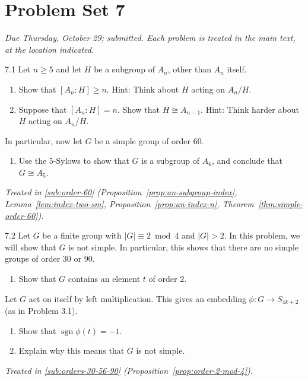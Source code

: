 \documentclass[11pt]{report}
\newcommand{\sgn}{\operatorname{sgn}}
\begin{document}
\section*{Problem Set 7}
{}

\textit{Due Thursday, October 29; submitted. Each problem is treated in the main text, at the location indicated.}

\begin{hwbox}{7.1}\label{hw:7.1}
Let $n \geq 5$ and let $H$ be a subgroup of $A_n$, other than $A_n$ itself.
\begin{enumerate}
\item Show that $[A_n : H] \geq n$. Hint: Think about $H$ acting on $A_n/H$.
\item Suppose that $[A_n : H] = n$. Show that $H \cong A_{n-1}$. Hint: Think harder about $H$ acting on $A_n/H$.
\end{enumerate}
In particular, now let $G$ be a simple group of order $60$.
\begin{enumerate}[resume]
\item Use the $5$-Sylows to show that $G$ is a subgroup of $A_6$, and conclude that $G \cong A_5$.
\end{enumerate}
\end{hwbox}
\textit{Treated in \ref{sub:order-60} (Proposition~\ref{prop:an-subgroup-index}, Lemma~\ref{lem:index-two-sm}, Proposition~\ref{prop:an-index-n}, Theorem~\ref{thm:simple-order-60}).}

\begin{hwbox}{7.2}\label{hw:7.2}
Let $G$ be a finite group with $|G| \equiv 2 \bmod 4$ and $|G| > 2$. In this problem, we will show that $G$ is not simple. In particular, this shows that there are no simple groups of order $30$ or $90$.
\begin{enumerate}
\item Show that $G$ contains an element $t$ of order $2$.
\end{enumerate}
Let $G$ act on itself by left multiplication. This gives an embedding $\phi : G \to S_{4k+2}$ (as in Problem 3.1).
\begin{enumerate}[resume]
\item Show that $\sgn \phi(t) = -1$.
\item Explain why this means that $G$ is not simple.
\end{enumerate}
\end{hwbox}
\textit{Treated in \ref{sub:orders-30-56-90} (Proposition~\ref{prop:order-2-mod-4}).}
\end{document}
